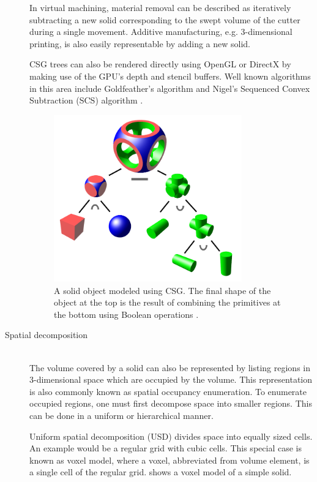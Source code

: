 \begin{description}
	In virtual machining, material removal can be described as iteratively subtracting a new solid corresponding to the swept volume of the cutter during a single movement.
	Additive manufacturing, e.g. 3-dimensional printing, is also easily representable by adding a new solid.

	CSG trees can also be rendered directly using OpenGL or DirectX by making use of the GPU's depth and stencil buffers.
	Well known algorithms in this area include Goldfeather's algorithm \cite{goldfeather} and Nigel's Sequenced Convex Subtraction (SCS) algorithm \cite{scs}.

	\begin{figure}[H]
		\centering
		\includegraphics[width=0.8\textwidth]{images/csg_tree}
		\caption{
			A solid object modeled using CSG.
			The final shape of the object at the top is the result of combining the primitives at the bottom using Boolean operations \cite{csg_tree}.
		}
		\label{fig:csg_tree}
	\end{figure}

	\item[Spatial decomposition] \hfill \\
	The volume covered by a solid can also be represented by listing regions in 3-dimensional space which are occupied by the volume.
	This representation is also commonly known as spatial occupancy enumeration.
	To enumerate occupied regions, one must first decompose space into smaller regions.
	This can be done in a uniform or hierarchical manner.

	Uniform spatial decomposition (USD) divides space into equally sized cells.
	An example would be a regular grid with cubic cells.
	This special case is known as voxel model, where a voxel, abbreviated from volume element, is a single cell of the regular grid.
	 shows a voxel model of a simple solid.


\end{description}
